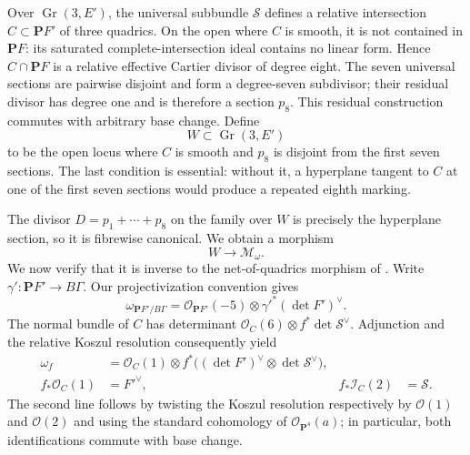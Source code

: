 \documentclass[12pt,reqno]{amsart}
\newcommand{\M}{\mathcal{M}}
\theoremstyle{definition}
\theoremstyle{remark}
\begin{document}
Over $\operatorname{Gr}(3,E')$, the universal subbundle $\mathcal S$ defines
a relative intersection $C\subset\mathbf P F'$ of three quadrics.  On the
open where $C$ is smooth, it is not contained in $\mathbf P F$: its saturated
complete-intersection ideal contains no linear form.  Hence
$C\cap\mathbf P F$ is a relative effective Cartier divisor of degree eight.
The seven universal sections are pairwise disjoint and form a degree-seven
subdivisor; their residual divisor has degree one and is therefore a section
$p_8$.  This residual construction commutes with arbitrary base change.
Define
\begin{equation}\label{eq:corrected-W}
 W\subset\operatorname{Gr}(3,E')
\end{equation}
to be the open locus where $C$ is smooth and $p_8$ is disjoint from the first
seven sections.  The last condition is essential: without it, a hyperplane
tangent to $C$ at one of the first seven sections would produce a repeated
eighth marking.

The divisor $D=p_1+\cdots+p_8$ on the family over $W$ is precisely the
hyperplane section, so it is fibrewise canonical.  We obtain a morphism
\begin{equation}\label{eq:W-to-Momega}
 W\longrightarrow\M_\omega.
\end{equation}
We now verify that it is inverse to the net-of-quadrics morphism of
\cite[Proposition~3.3]{Liu}.  Write
$\gamma':\mathbf P F'\to B\Gamma$.  Our projectivization convention gives
\begin{equation}\label{eq:relative-adjunction}
 \omega_{\mathbf P F'/B\Gamma}
 =\mathcal O_{\mathbf P F'}(-5)\otimes
 \gamma'^*(\det F')^\vee.
\end{equation}
The normal bundle of $C$ has determinant
$\mathcal O_C(6)\otimes f^*\det\mathcal S^\vee$.  Adjunction and the relative
Koszul resolution consequently yield
\begin{align}
 \omega_f&=\mathcal O_C(1)\otimes
 f^*\bigl((\det F')^\vee\otimes\det\mathcal S^\vee\bigr),
 \label{eq:exceptional-adjunction}\\
 f_*\mathcal O_C(1)&=F'^\vee,
 &f_*\mathcal I_C(2)&=\mathcal S.\label{eq:exceptional-koszul}
\end{align}
The second line follows by twisting the Koszul resolution respectively by
$\mathcal O(1)$ and $\mathcal O(2)$ and using the standard cohomology of
$\mathcal O_{\mathbf P^4}(a)$; in particular, both identifications commute
with base change.
\end{document}
